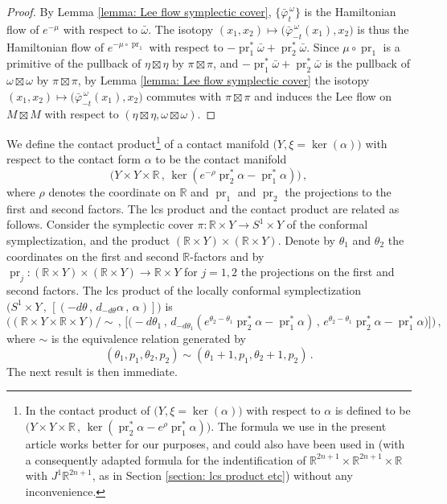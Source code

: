 \documentclass{amsart}
\DeclareMathOperator{\pr}{pr}
\theoremstyle{remark}
\begin{document}
\begin{proof}
By Lemma \ref{lemma: Lee flow symplectic cover},
$\{\bar{\varphi}_t^{\,\omega}\}$ is the Hamiltonian flow
of $e^{-\mu}$ with respect to $\bar{\omega}$.
The isotopy
$(x_1, x_2) \mapsto \big( \bar{\varphi}_{-t}^{\,\omega} (x_1) , x_2 \big)$
is thus the Hamiltonian flow of $e^{-\mu \circ \pr_1}$
with respect to 
$- \pr_1^{\ast}\bar{\omega} + \pr_2^{\ast}\bar{\omega}$.
Since $\mu \circ \pr_1$ is a primitive
of the pullback of $\eta \boxtimes \eta$
by $\pi \boxtimes \pi$,
and $- \pr_1^{\ast}\bar{\omega} + \pr_2^{\ast}\bar{\omega}$
is the pullback of $\omega \boxtimes \omega$
by $\pi \boxtimes \pi$,
by Lemma \ref{lemma: Lee flow symplectic cover}
the isotopy $(x_1, x_2)
\mapsto \big( \bar{\varphi}_{-t}^{\,\omega} (x_1) , x_2 \big)$
commutes with $\pi \boxtimes \pi$
and induces the Lee flow on $M \boxtimes M$
with respect to
$(\eta \boxtimes \eta, \omega \boxtimes \omega)$.
\end{proof}

We define the contact product\footnote{
In \cite{Bhupal,San10, San11, FSZ}
the contact product of $\big(Y, \xi = \ker(\alpha)\big)$
with respect to $\alpha$
is defined to be
$\big( Y \times Y \times \mathbb{R} \,,\,
\ker ( \pr_2^{\ast} \alpha - e^{\rho} \pr_1^{\ast} \alpha) \big)$.
The formula we use in the present article
works better for our purposes,
and could also have been used
in \cite{Bhupal,San10, San11, FSZ}
(with a consequently adapted formula
for the indentification
of $\mathbb{R}^{2n+1} \times \mathbb{R}^{2n+1} \times \mathbb{R}$
with $J^1\mathbb{R}^{2n+1}$,
as in Section \ref{section: lcs product etc})
without any inconvenience.}
of a contact manifold
$\big(Y, \xi = \ker(\alpha)\big)$
with respect to the contact form $\alpha$
to be the contact manifold
\[
\big( Y \times Y \times \mathbb{R} \,,\,
\ker ( e^{-\rho} \pr_2^{\ast} \alpha - \pr_1^{\ast} \alpha) \big) \,,
\]
where $\rho$ denotes the coordinate on $\mathbb{R}$
and $\pr_1$ and $\pr_2$ the projections
to the first and second factors.
The lcs product and the contact product
are related as follows.
Consider the symplectic cover
$\pi: \mathbb{R} \times Y \rightarrow S^1 \times Y$
of the conformal symplectization,
and the product $(\mathbb{R} \times Y) \times (\mathbb{R} \times Y)$.
Denote by $\theta_1$ and $\theta_2$
the coordinates on the first and second $\mathbb{R}$-factors
and by $\pr_j: (\mathbb{R} \times Y) \times (\mathbb{R} \times Y)
\rightarrow \mathbb{R} \times Y$
for $j = 1, 2$
the projections on the first and second factors.
The lcs product of the locally conformal symplectization
$\big(S^1 \times Y \,,\, [(-d\theta \,,\, d_{-d\theta}\alpha \,,\, \alpha)] \big)$
is
\[
\Big( (\mathbb{R} \times Y \times \mathbb{R} \times Y)/\sim \,,\, 
\big[\big(-d\theta_1 \,,\,
d_{-d\theta_1} ( e^{\theta_2 - \theta_1} \pr_2^{\ast}\alpha - \pr_1^{\ast}\alpha ) \,,\,
e^{\theta_2 - \theta_1} \pr_2^{\ast}\alpha - \pr_1^{\ast}\alpha \big)\big]
\Big) \,,
\]
where $\sim$ is the equivalence relation generated by
\[
(\theta_1, p_1, \theta_2, p_2) \sim (\theta_1 + 1, p_1, \theta_2 + 1, p_2) \,.
\]
The next result is then immediate.
\end{document}

